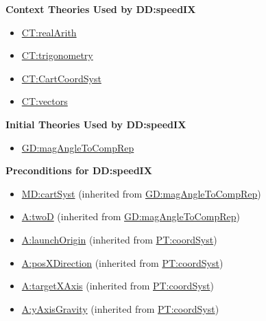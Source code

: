 \documentclass[12pt]{article}
\begin{document}
\noindent \textbf{Context Theories Used by DD:speedIX}

\begin{itemize}
\item \hyperref[CT:realArith]{CT:realArith}
\item \hyperref[CT:trigonometry]{CT:trigonometry}
\item \hyperref[CT:CartCoordSyst]{CT:CartCoordSyst}
\item \hyperref[CT:vectors]{CT:vectors}
\end{itemize}

\noindent \textbf{Initial Theories Used by DD:speedIX}

\begin{itemize}
\item \hyperref[GD:magAngleToCompRep]{GD:magAngleToCompRep}
\end{itemize}

\noindent \textbf{Preconditions for DD:speedIX}

\begin{itemize}
\item \hyperref[MD:cartSyst]{MD:cartSyst} (inherited from \hyperref[GD:magAngleToCompRep]{GD:magAngleToCompRep})
\item \hyperref[twoD]{A:twoD} (inherited from \hyperref[GD:magAngleToCompRep]{GD:magAngleToCompRep})
\item \hyperref[launchOrigin]{A:launchOrigin} (inherited from \hyperref[PT:coordSyst]{PT:coordSyst})
\item \hyperref[posXDirection]{A:posXDirection} (inherited from \hyperref[PT:coordSyst]{PT:coordSyst})
\item \hyperref[targetXAxis]{A:targetXAxis} (inherited from \hyperref[PT:coordSyst]{PT:coordSyst})
\item \hyperref[yAxisGravity]{A:yAxisGravity} (inherited from \hyperref[PT:coordSyst]{PT:coordSyst})
\end{itemize}
\end{document}
